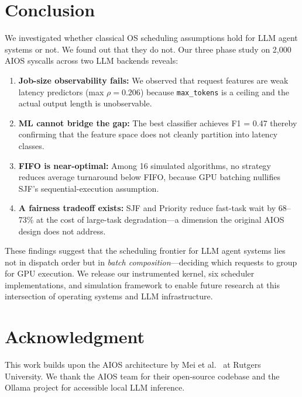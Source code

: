 \documentclass[conference]{IEEEtran}
\begin{document}
\section{Conclusion}

We investigated whether classical OS scheduling assumptions hold for LLM agent systems or not. We found out that they do not. Our three phase study on 2,000 AIOS syscalls across two LLM backends reveals:

\begin{enumerate}
    \item \textbf{Job-size observability fails:} We observed that request features are weak latency predictors (max $\rho = 0.206$) because \texttt{max\_tokens} is a ceiling and the actual output length is unobservable.
    \item \textbf{ML cannot bridge the gap:} The best classifier achieves F1 = 0.47 thereby confirming that the feature space does not cleanly partition into latency classes.
    \item \textbf{FIFO is near-optimal:} Among 16 simulated algorithms, no strategy reduces average turnaround below FIFO, because GPU batching nullifies SJF's sequential-execution assumption.
    \item \textbf{A fairness tradeoff exists:} SJF and Priority reduce fast-task wait by 68--73\% at the cost of large-task degradation---a dimension the original AIOS design does not address.
\end{enumerate}

These findings suggest that the scheduling frontier for LLM agent systems lies not in dispatch order but in \textit{batch composition}---deciding which requests to group for GPU execution. We release our instrumented kernel, six scheduler implementations, and simulation framework to enable future research at this intersection of operating systems and LLM infrastructure.

\section*{Acknowledgment}
This work builds upon the AIOS architecture by Mei et al.~\cite{mei2025aios} at Rutgers University. We thank the AIOS team for their open-source codebase and the Ollama project for accessible local LLM inference.
\end{document}
